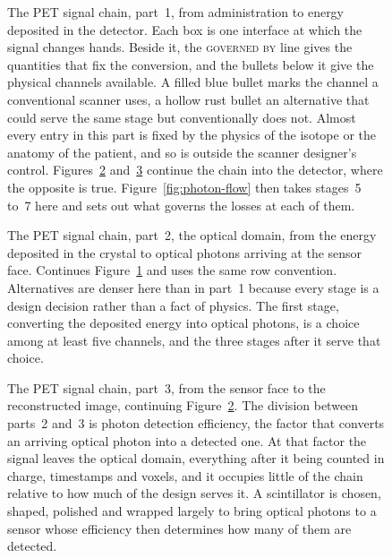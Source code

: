 \begin{figure}[p]
	\centering
	
	\caption[The PET signal chain, part 1: emission and transport]{%
		The PET signal chain, part~1, from administration to energy deposited in the detector.
		Each box is one interface at which the signal changes hands.
		Beside it, the \textsc{governed by} line gives the quantities that fix the conversion, and the bullets below it give the physical channels available. A filled blue bullet marks the channel a conventional scanner uses, a hollow rust bullet an alternative that could serve the same stage but conventionally does not.
		Almost every entry in this part is fixed by the physics of the isotope or the anatomy of the patient, and so is outside the scanner designer's control. Figures~\ref{fig:chain-optical} and~\ref{fig:chain-readout} continue the chain into the detector, where the opposite is true.
		Figure~\ref{fig:photon-flow} then takes stages~5 to~7 here and sets out what governs the losses at each of them.}
	\label{fig:chain-emission}
\end{figure}

\begin{figure}[p]
	\centering
	
	\caption[The PET signal chain, part 2: the optical domain]{%
		The PET signal chain, part~2, the optical domain, from the energy deposited in the crystal to optical photons arriving at the sensor face.
		Continues Figure~\ref{fig:chain-emission} and uses the same row convention.
		Alternatives are denser here than in part~1 because every stage is a design decision rather than a fact of physics.
		The first stage, converting the deposited energy into optical photons, is a choice among at least five channels, and the three stages after it serve that choice.}
	\label{fig:chain-optical}
\end{figure}

\begin{figure}[p]
	\centering
	
	\caption[The PET signal chain, part 3: readout and reconstruction]{%
		The PET signal chain, part~3, from the sensor face to the reconstructed image, continuing Figure~\ref{fig:chain-optical}.
		The division between parts~2 and~3 is photon detection efficiency, the factor that converts an arriving optical photon into a detected one.
		At that factor the signal leaves the optical domain, everything after it being counted in charge, timestamps and voxels, and it occupies little of the chain relative to how much of the design serves it.
		A scintillator is chosen, shaped, polished and wrapped largely to bring optical photons to a sensor whose efficiency then determines how many of them are detected.}
	\label{fig:chain-readout}
\end{figure}

